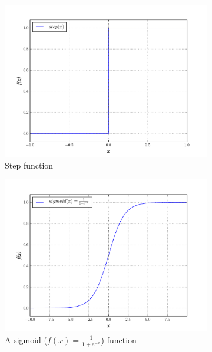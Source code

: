 \documentclass[10pt,a4paper,DIV=11]{scrreprt}
\begin{document}
\begin{figure}[H]

\centering
\begin{subfigure}{.5\textwidth}
  \centering
  \includegraphics[width=1.1\linewidth]{files/activation/step.pdf}
  \caption{Step function}
  \label{fig:plot1}
\end{subfigure}%
\begin{subfigure}{.5\textwidth}
  \centering
  \includegraphics[width=1.1\linewidth]{files/activation/sigmoid.pdf}
  \caption{A sigmoid ($f(x) = \frac{1}{1+e^{-x}}$) function}
  \label{fig:plot2}
\end{subfigure}
\newline
\begin{subfigure}{.5\textwidth}

\end{subfigure}
\end{figure}
\end{document}
